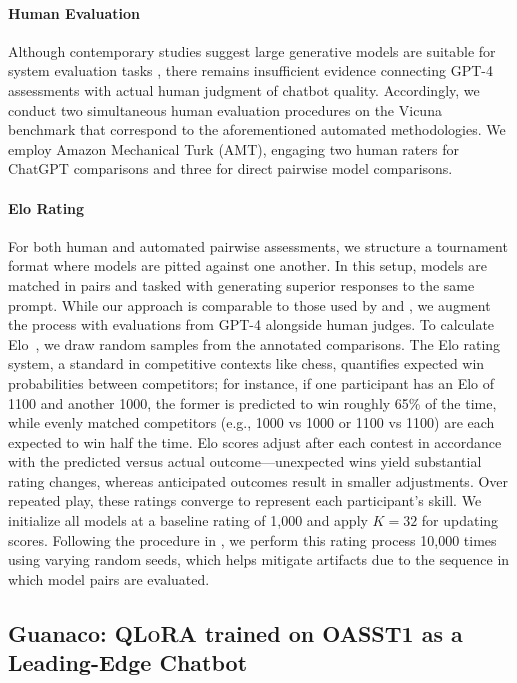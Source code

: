 \paragraph{Human Evaluation} Although contemporary studies suggest large generative models are suitable for system evaluation tasks \citep{fu2023gptscore}, there remains insufficient evidence connecting GPT-4 assessments with actual human judgment of chatbot quality. Accordingly, we conduct two simultaneous human evaluation procedures on the Vicuna benchmark that correspond to the aforementioned automated methodologies. We employ Amazon Mechanical Turk (AMT), engaging two human raters for ChatGPT comparisons and three for direct pairwise model comparisons.

\paragraph{Elo Rating} For both human and automated pairwise assessments, we structure a tournament format where models are pitted against one another. In this setup, models are matched in pairs and tasked with generating superior responses to the same prompt. While our approach is comparable to those used by \citet{bai2022training} and \citet{vicuna2023}, we augment the process with evaluations from GPT-4 alongside human judges. To calculate Elo~\citep{elo1967proposed,elo1978rating}, we draw random samples from the annotated comparisons. The Elo rating system, a standard in competitive contexts like chess, quantifies expected win probabilities between competitors; for instance, if one participant has an Elo of 1100 and another 1000, the former is predicted to win roughly 65\% of the time, while evenly matched competitors (e.g., 1000 vs 1000 or 1100 vs 1100) are each expected to win half the time. Elo scores adjust after each contest in accordance with the predicted versus actual outcome—unexpected wins yield substantial rating changes, whereas anticipated outcomes result in smaller adjustments. Over repeated play, these ratings converge to represent each participant’s skill. We initialize all models at a baseline rating of 1,000 and apply $K=32$ for updating scores. Following the procedure in \citet{vicuna2023}, we perform this rating process 10,000 times using varying random seeds, which helps mitigate artifacts due to the sequence in which model pairs are evaluated.

\subsection{\textbf{Guanaco}: \textsc{QLoRA} trained on OASST1 as a Leading-Edge Chatbot} 

